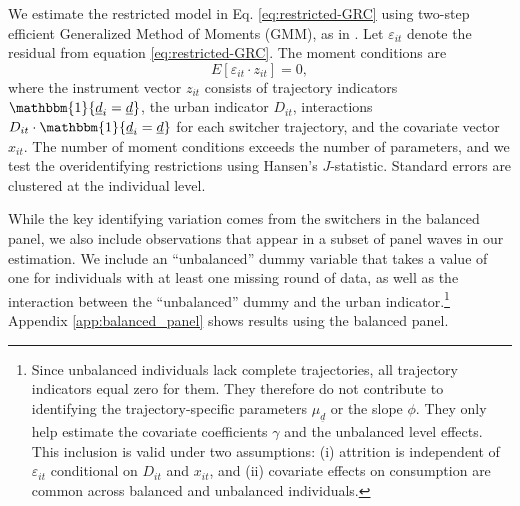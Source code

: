 We estimate the restricted model in Eq. \eqref{eq:restricted-GRC} using two-step efficient Generalized Method of Moments (GMM), as in \cite{tjernstromCommentSuri2011}. 
Let $\varepsilon_{it}$ denote the residual from equation \eqref{eq:restricted-GRC}. The moment conditions are
\begin{equation}\label{eq:gmm-moments}
    E\!\left[\varepsilon_{it} \cdot z_{it}\right] = 0,
\end{equation}
where the instrument vector $z_{it}$ consists of trajectory indicators $\mathbbm{1}\{\underline{d}_i = \underline{d}\}$, the urban indicator $D_{it}$, interactions $D_{it} \cdot \mathbbm{1}\{\underline{d}_i = \underline{d}\}$ for each switcher trajectory, and the covariate vector $x_{it}$.
The number of moment conditions exceeds the number of parameters, and we test the overidentifying restrictions using Hansen's $J$-statistic.
Standard errors are clustered at the individual level.

While the key identifying variation comes from the switchers in the balanced panel, we also include observations that appear in a subset of panel waves in our estimation.
We include an ``unbalanced'' dummy variable that takes a value of one for individuals with at least one missing round of data, as well as the interaction between the ``unbalanced'' dummy and the urban indicator.\footnote{Since unbalanced individuals lack complete trajectories, all trajectory indicators equal zero for them. They therefore do not contribute to identifying the trajectory-specific parameters $\mu_{\underline{d}}$ or the slope $\phi$. They only help estimate the covariate coefficients $\gamma$ and the unbalanced level effects. This inclusion is valid under two assumptions: (i) attrition is independent of $\varepsilon_{it}$ conditional on $D_{it}$ and $x_{it}$, and (ii) covariate effects on consumption are common across balanced and unbalanced individuals.}
Appendix \ref{app:balanced_panel} shows results using the balanced panel.

